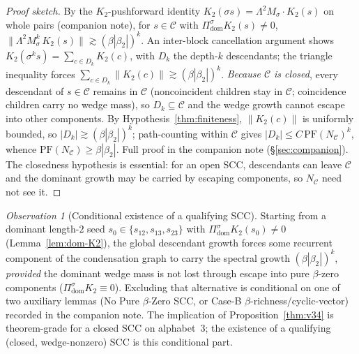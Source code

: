 \documentclass[11pt]{article}
\theoremstyle{plain}
\theoremstyle{definition}
\theoremstyle{remark}
\newtheorem{observation}[theorem]{Observation}
\newcommand{\C}{\mathcal{C}}
\newcommand{\PFroot}{\mathrm{PF}}
\begin{document}
\begin{proof}[Proof sketch]
By the $K_2$-pushforward identity $K_2(\sigma s)=\Lambda^2 M_\sigma\cdot K_2(s)$ on whole pairs (companion note), for $s\in\C$ with $\Pi^\sigma_{\mathrm{dom}}K_2(s)\ne0$, $\|\Lambda^2 M_\sigma^k\,K_2(s)\|\gtrsim(\beta|\beta_2|)^k$. An inter-block cancellation argument shows $K_2(\sigma^k s)=\sum_{c\in D_k}K_2(c)$, with $D_k$ the depth-$k$ descendants; the triangle inequality forces $\sum_{c\in D_k}\|K_2(c)\|\gtrsim(\beta|\beta_2|)^k$. \emph{Because $\C$ is closed}, every descendant of $s\in\C$ remains in $\C$ (noncoincident children stay in $\C$; coincidence children carry no wedge mass), so $D_k\subseteq\C$ and the wedge growth cannot escape into other components. By Hypothesis~\ref{thm:finiteness}, $\|K_2(c)\|$ is uniformly bounded, so $|D_k|\gtrsim(\beta|\beta_2|)^k$; path-counting within $\C$ gives $|D_k|\le C\,\PFroot(N_\C)^k$, whence $\PFroot(N_\C)\ge\beta|\beta_2|$. Full proof in the companion note (\S\ref{sec:companion}). The closedness hypothesis is essential: for an open SCC, descendants can leave $\C$ and the dominant growth may be carried by escaping components, so $N_\C$ need not see it.
\end{proof}

\begin{observation}[Conditional existence of a qualifying SCC]\label{obs:v34-existence}
Starting from a dominant length-$2$ seed $s_0\in\{s_{12},s_{13},s_{23}\}$ with $\Pi^\sigma_{\mathrm{dom}}K_2(s_0)\ne0$ (Lemma~\ref{lem:dom-K2}), the global descendant growth forces some recurrent component of the condensation graph to carry the spectral growth $(\beta|\beta_2|)^k$, \emph{provided} the dominant wedge mass is not lost through escape into pure $\beta$-zero components ($\Pi^\sigma_{\mathrm{dom}}K_2\equiv0$). Excluding that alternative is conditional on one of two auxiliary lemmas (No Pure $\beta$-Zero SCC, or Case-B $\beta$-richness/cyclic-vector) recorded in the companion note. The implication of Proposition~\ref{thm:v34} is theorem-grade for a closed SCC on alphabet~3; the existence of a qualifying (closed, wedge-nonzero) SCC is this conditional part.
\end{observation}
\end{document}
